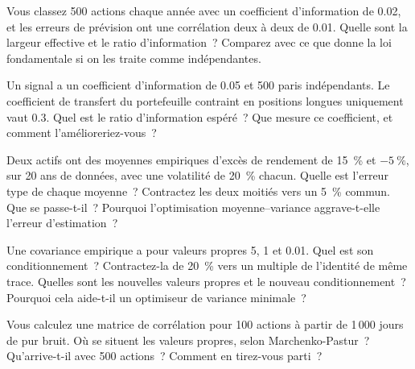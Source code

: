 \begin{question}\label{iq:iv2:portfolio-construction:11}
Vous classez 500 actions chaque année avec un coefficient d'information de 0.02, et les erreurs de prévision ont une corrélation deux à deux de 0.01. Quelle sont la largeur effective et le ratio d'information~? Comparez avec ce que donne la loi fondamentale si on les traite comme indépendantes.
\end{question}

\begin{question}\label{iq:iv2:portfolio-construction:12}
Un signal a un coefficient d'information de 0.05 et 500 paris indépendants. Le coefficient de transfert du portefeuille contraint en positions longues uniquement vaut 0.3. Quel est le ratio d'information espéré~? Que mesure ce coefficient, et comment l'amélioreriez-vous~?
\end{question}

\begin{question}\label{iq:iv2:portfolio-construction:13}
Deux actifs ont des moyennes empiriques d'excès de rendement de 15~\% et $-5~\%$, sur 20 ans de données, avec une volatilité de 20~\% chacun. Quelle est l'erreur type de chaque moyenne~? Contractez les deux moitiés vers un 5~\% commun. Que se passe-t-il~? Pourquoi l'optimisation moyenne--variance aggrave-t-elle l'erreur d'estimation~?
\end{question}

\begin{question}\label{iq:iv2:portfolio-construction:14}
Une covariance empirique a pour valeurs propres 5, 1 et 0.01. Quel est son conditionnement~? Contractez-la de 20~\% vers un multiple de l'identité de même trace. Quelles sont les nouvelles valeurs propres et le nouveau conditionnement~? Pourquoi cela aide-t-il un optimiseur de variance minimale~?
\end{question}

\begin{question}\label{iq:iv2:portfolio-construction:15}
Vous calculez une matrice de corrélation pour 100 actions à partir de 1\,000 jours de pur bruit. Où se situent les valeurs propres, selon Marchenko-Pastur~? Qu'arrive-t-il avec 500 actions~? Comment en tirez-vous parti~?
\end{question}

